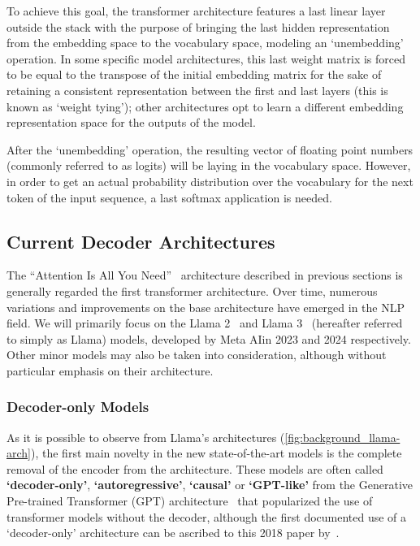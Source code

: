 To achieve this goal, the transformer architecture features a last linear layer outside the stack with the purpose of bringing the last hidden representation from the embedding space to the vocabulary space, modeling an `unembedding' operation.
In some specific model architectures, this last weight matrix is forced to be equal to the transpose of the initial embedding matrix for the sake of retaining a consistent representation between the first and last layers (this is known as `weight tying'); other architectures opt to learn a different embedding representation space for the outputs of the model.

After the `unembedding' operation, the resulting vector of floating point numbers (commonly referred to as logits) will be laying in the vocabulary space.
However, in order to get an actual probability distribution over the vocabulary for the next token of the input sequence, a last softmax application is needed.

\subsection{Current Decoder Architectures}\label{ssec:background_transf_current}

The ``Attention Is All You Need''~\cite{vaswani2017} architecture described in previous sections is generally regarded the first transformer architecture.
Over time, numerous variations and improvements on the base architecture have emerged in the NLP field.
We will primarily focus on the Llama 2~\cite{touvron2023} and Llama 3~\cite{dubey2024} (hereafter referred to simply as Llama) models, developed by Meta AI\footnotemark in 2023 and 2024 respectively.
Other minor models may also be taken into consideration, although without particular emphasis on their architecture.


\subsubsection*{Decoder-only Models}

As it is possible to observe from Llama's architectures (\cref{fig:background_llama-arch}), the first main novelty in the new state-of-the-art models is the complete removal of the encoder from the architecture.
These models are often called \textbf{`decoder-only'}, \textbf{`autoregressive'}, \textbf{`causal'} or \textbf{`GPT-like'} from the Generative Pre-trained Transformer (GPT) architecture~\cite{radford2018,radford2019,brown2020,openai2023} that popularized the use of transformer models without the decoder, although the first documented use of a `decoder-only' architecture can be ascribed to this 2018 paper by~\citet{liu2018}.

